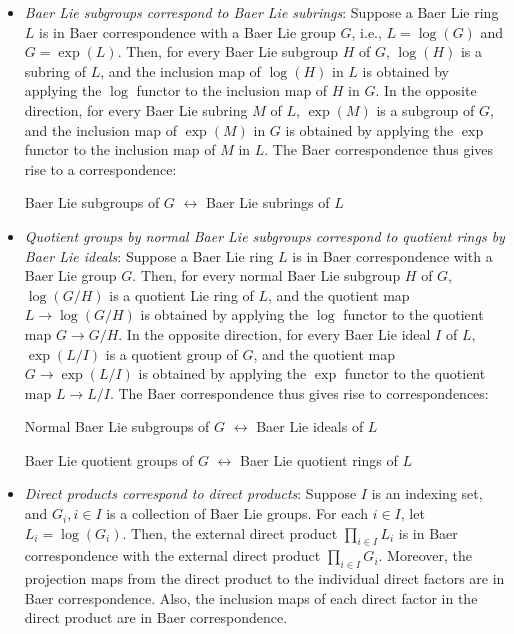 \begin{itemize}
\item {\em Baer Lie subgroups correspond to Baer Lie subrings}:
  Suppose a Baer Lie ring $L$ is in Baer correspondence with a Baer
  Lie group $G$, i.e., $L = \log(G)$ and $G = \exp(L)$. Then, for
  every Baer Lie subgroup $H$ of $G$, $\log(H)$ is a subring of $L$,
  and the inclusion map of $\log(H)$ in $L$ is obtained by applying
  the $\log$ functor to the inclusion map of $H$ in $G$. In the
  opposite direction, for every Baer Lie subring $M$ of $L$, $\exp(M)$
  is a subgroup of $G$, and the inclusion map of $\exp(M)$ in $G$ is
  obtained by applying the $\exp$ functor to the inclusion map of $M$
  in $L$. The Baer correspondence thus gives rise to a correspondence:

  \begin{center}
    Baer Lie subgroups of $G$ $\leftrightarrow$ Baer Lie subrings of $L$
  \end{center}

\item {\em Quotient groups by normal Baer Lie subgroups correspond to
  quotient rings by Baer Lie ideals}: Suppose a Baer Lie ring $L$ is
  in Baer correspondence with a Baer Lie group $G$. Then, for every
  normal Baer Lie subgroup $H$ of $G$, $\log(G/H)$ is a quotient Lie
  ring of $L$, and the quotient map $L \to \log(G/H)$ is obtained by
  applying the $\log$ functor to the quotient map $G \to G/H$. In the
  opposite direction, for every Baer Lie ideal $I$ of $L$, $\exp(L/I)$
  is a quotient group of $G$, and the quotient map $G \to \exp(L/I)$
  is obtained by applying the $\exp$ functor to the quotient map $L
  \to L/I$. The Baer correspondence thus gives rise to
  correspondences:

  \begin{center}
    Normal Baer Lie subgroups of $G$ $\leftrightarrow$ Baer Lie ideals of $L$
  \end{center}
  
  \begin{center}
    Baer Lie quotient groups of $G$ $\leftrightarrow$ Baer Lie
    quotient rings of $L$
  \end{center}

\item {\em Direct products correspond to direct products}: Suppose $I$
  is an indexing set, and $G_i, i \in I$ is a collection of Baer Lie
  groups. For each $i \in I$, let $L_i = \log(G_i)$. Then, the
  external direct product $\prod_{i \in I} L_i$ is in Baer
  correspondence with the external direct product $\prod_{i \in I}
  G_i$. Moreover, the projection maps from the direct product to the
  individual direct factors are in Baer correspondence. Also, the
  inclusion maps of each direct factor in the direct product are in
  Baer correspondence.
\end{itemize}


